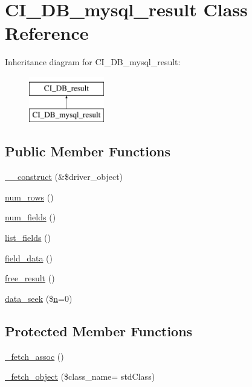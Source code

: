 \hypertarget{class_c_i___d_b__mysql__result}{}\section{C\+I\+\_\+\+D\+B\+\_\+mysql\+\_\+result Class Reference}
\label{class_c_i___d_b__mysql__result}
Inheritance diagram for C\+I\+\_\+\+D\+B\+\_\+mysql\+\_\+result\+:\begin{figure}[H]
\begin{center}
\leavevmode
\includegraphics[height=2.000000cm]{class_c_i___d_b__mysql__result}
\end{center}
\end{figure}
\subsection*{Public Member Functions}
\begin{DoxyCompactItemize}
\item 
\hyperlink{class_c_i___d_b__mysql__result_a8e093c8b6e5733bc3f306385ee426ab7}{\+\_\+\+\_\+construct} (\&\$driver\+\_\+object)
\item 
\hyperlink{class_c_i___d_b__mysql__result_a218657c303ee499b97710ab0cd2f5d6e}{num\+\_\+rows} ()
\item 
\hyperlink{class_c_i___d_b__mysql__result_af831bf363e4d7d661a717a4932af449d}{num\+\_\+fields} ()
\item 
\hyperlink{class_c_i___d_b__mysql__result_a50b54eb4ea7cfd039740f532988ea776}{list\+\_\+fields} ()
\item 
\hyperlink{class_c_i___d_b__mysql__result_a84bffd65e53902ade1591716749a33e3}{field\+\_\+data} ()
\item 
\hyperlink{class_c_i___d_b__mysql__result_aad2d98d6beb3d6095405356c6107b473}{free\+\_\+result} ()
\item 
\hyperlink{class_c_i___d_b__mysql__result_a8255ae91816e4206e29eb7581c5af0f1}{data\+\_\+seek} (\$\hyperlink{cli_2error__general_8php_ace0fd03cd383f20ce6ea63247a207294}{n}=0)
\end{DoxyCompactItemize}
\subsection*{Protected Member Functions}
\begin{DoxyCompactItemize}
\item 
\hyperlink{class_c_i___d_b__mysql__result_a43a9a92817f1334a1c10752ec44275a0}{\+\_\+fetch\+\_\+assoc} ()
\item 
\hyperlink{class_c_i___d_b__mysql__result_ac0acae0a13c8bfe4c34198813ecf43a0}{\+\_\+fetch\+\_\+object} (\$class\+\_\+name= \textquotesingle{}std\+Class\textquotesingle{})
\end{DoxyCompactItemize}

